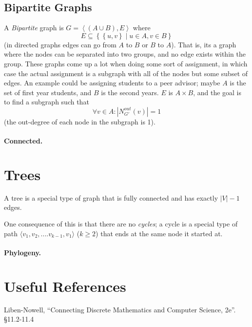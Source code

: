 \subsection{Bipartite Graphs}
A \emph{Bipartite} graph is $G=\left\langle \left(A\cup B\right), E \right\rangle$ 
where \[E\subseteq \left\{\left\{u,v\right\} \mid u\in A, v\in B\right\}\] (in directed graphs edges can go from $A$ to $B$ or $B$ to $A$). 
That is, its a graph where the nodes can be separated into two groups, and no edge exists within the group.  
These graphs come up a lot when doing some sort of assignment, in which case the actual assignment is a subgraph with all of the nodes but some subset of edges.
An example could be assigning students to a peer advisor; 
maybe $A$ is the set of first year students, and $B$ is the second years. 
$E$ is $A\times B$, and the goal is to find a subgraph such that 
\[\forall v \in A: |N^{out}_{G'}(v)|=1\]
(the out-degree of each node in the subgraph is 1).


\paragraph{Connected.} 


\section{Trees}
A tree is a special type of graph that is fully connected and has exactly $|V|-1$ edges. 

One consequence of this is that there are no \emph{cycles};
a cycle is a special type of path $\langle v_1, v_2,.... v_{k-1}, v_1\rangle$ ($k\ge 2$) that ends at the same node it started at. 


\paragraph{Phylogeny.}


\section*{Useful References}
Liben-Nowell, ``Connecting Discrete Mathematics and Computer Science, 2e''. \S 11.2-11.4

